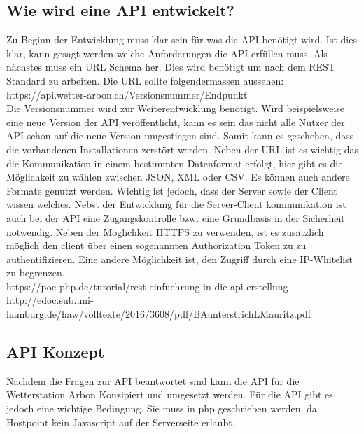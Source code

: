 \subsection{Wie wird eine API entwickelt?}
Zu Beginn der Entwicklung muss klar sein für was die API benötigt wird. Ist dies klar, kann gesagt werden welche Anforderungen die API erfüllen muss. Als nächstes muss ein URL Schema her. Dies wird benötigt um nach dem REST Standard zu arbeiten. Die URL sollte folgendermassen aussehen: \\ https://api.wetter-arbon.ch/Versionsnummer/Endpunkt\\
Die Versionsnummer wird zur Weiterentwicklung benötigt. Wird beispielsweise eine neue Version der API veröffentlicht, kann es sein das nicht alle Nutzer der API schon auf die neue Version umgestiegen sind. Somit kann es geschehen, dass die vorhandenen Installationen zerstört werden. Neben der URL ist es wichtig das die Kommunikation in einem bestimmten Datenformat erfolgt, hier gibt es die Möglichkeit zu wählen zwischen JSON, XML oder CSV. Es können auch andere Formate genutzt werden. Wichtig ist jedoch, dass der Server sowie der Client wissen welches. Nebst der Entwicklung für die Server-Client kommunikation ist auch bei der API eine Zugangskontrolle bzw. eine Grundbasis in der Sicherheit notwendig. Neben der Möglichkeit HTTPS zu verwenden, ist es zusätzlich möglich den client über einen sogenannten Authorization Token zu zu authentifizieren. Eine andere Möglichkeit ist, den Zugriff durch eine IP-Whitelist zu begrenzen. \\

https://poe-php.de/tutorial/rest-einfuehrung-in-die-api-erstellung\\
http://edoc.sub.uni-hamburg.de/haw/volltexte/2016/3608/pdf/BAunterstrichLMauritz.pdf\\

\subsection{API Konzept}
Nachdem die Fragen zur API beantwortet sind kann die API für die Wetterstation Arbon Konzipiert und umgesetzt werden. Für die API gibt es jedoch eine wichtige Bedingung. Sie muss in php geschrieben werden, da Hostpoint kein Javascript auf der Serverseite erlaubt.

